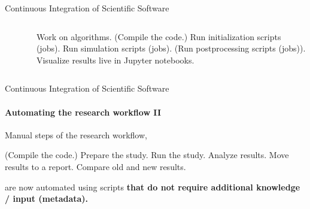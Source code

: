 \begin{frame}{Continuous Integration of Scientific Software}
{\begin{columns}
\begin{column}[c]{0.5\textwidth}
\begin{figure}
                \end{figure}
            \end{column}
            \begin{column}[c]{0.5\textwidth}
            \begin{algorithmic}
                    \State Work on algorithms.
                    \State (Compile the code.) 
                    \State Run initialization scripts (jobs).
                    \State Run simulation scripts (jobs). 
                    \State (Run postprocessing scripts (jobs)). 
                    \State Visualize results live in Jupyter notebooks. 
                \EndWhile
            \end{algorithmic}
            \end{column}
        \end{columns}
    }

\end{frame}


\begin{frame}{Continuous Integration of Scientific Software}
    \framesubtitle{Automating the research workflow II} 
    \vfill

     Manual steps of the research workflow,   
     \medskip
        \begin{algorithmic}
            \State (Compile the code.) 
                \State Prepare the study.
                \State Run the study.
                \State Analyze results. 
                \State Move results to a report. 
            \EndFor
            \State Compare old and new results. 
        \end{algorithmic}
    \medskip
    are now automated using scripts \textbf{that do not require additional knowledge / input (metadata).} \\

\end{frame}

